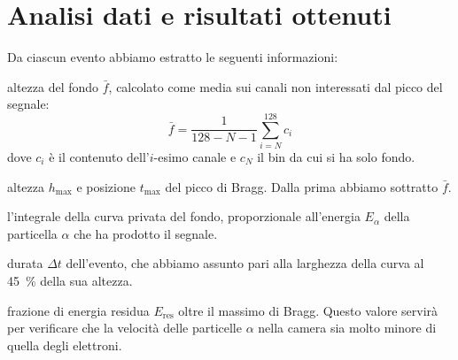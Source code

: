 \documentclass[italian,a4paper]{article}
\newenvironment{packed_enum}{
\begin{enumerate}
  \setlength{\itemsep}{1pt}
  \setlength{\parskip}{0pt}
  \setlength{\parsep}{0pt}
}{\end{enumerate}}
\renewcommand{\a}{\alpha}
\newcommand{\D}{\Delta}
\begin{document}
\section{Analisi dati e risultati ottenuti}
Da ciascun evento abbiamo estratto le seguenti informazioni:
\begin{packed_enum}
\item altezza del fondo $\bar{f}$, calcolato come media sui canali non interessati dal picco del segnale:
\begin{equation*}
\bar{f} = \frac{1}{128 - N - 1} \sum_{i=N}^{128}{c_i}
\end{equation*}
dove $c_i$ \`e il contenuto dell'$i$-esimo canale e $c_N$ il bin da cui si ha solo fondo.

\item altezza $h_{\max}$ e posizione $t_{\max}$ del picco di Bragg. Dalla prima abbiamo sottratto $\bar{f}$.

\item l'integrale della curva privata del fondo, proporzionale all'energia $E_\a$ della particella $\a$ che ha prodotto il segnale.

\item durata $\D t$ dell'evento, che abbiamo assunto pari alla larghezza della curva al 45~\% della sua altezza.

\item frazione di energia residua $E_{\text{res}}$ oltre il massimo di Bragg. Questo valore servir\`a per verificare che la velocit\`a delle particelle $\a$ nella camera sia molto minore di quella degli elettroni.
\end{packed_enum}
\end{document}
